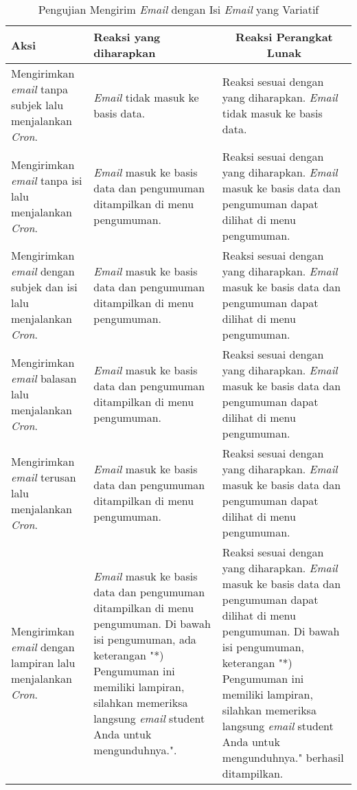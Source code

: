 \begin{itemize}
	\newpage
      \begin{longtable}{|p{5cm}|p{5cm}|p{5cm}|}
        \caption{Pengujian Mengirim \textit{Email} dengan Isi \textit{Email} yang Variatif}
        \label{table:pengujian-fungsional-isi-variatif}\\
        \hline
        \centering Aksi	& 	\centering Reaksi yang diharapkan &  \multicolumn{1}{c|}{Reaksi Perangkat Lunak} \\
        \hline
        Mengirimkan \textit{email} tanpa subjek lalu menjalankan \textit{Cron}. & \textit{Email} tidak masuk ke basis data. & Reaksi sesuai dengan yang diharapkan. \textit{Email} tidak masuk ke basis data. \\
        \hline
        Mengirimkan \textit{email} tanpa isi lalu menjalankan \textit{Cron}. & \textit{Email} masuk ke basis data dan pengumuman ditampilkan di menu pengumuman. & Reaksi sesuai dengan yang diharapkan. \textit{Email} masuk ke basis data dan pengumuman dapat dilihat di menu pengumuman. \\
        \hline
        Mengirimkan \textit{email} dengan subjek dan isi lalu menjalankan \textit{Cron}. & \textit{Email} masuk ke basis data dan pengumuman ditampilkan di menu pengumuman. & Reaksi sesuai dengan yang diharapkan. \textit{Email} masuk ke basis data dan pengumuman dapat dilihat di menu pengumuman. \\
        \hline
        Mengirimkan \textit{email} balasan lalu menjalankan \textit{Cron}. & \textit{Email} masuk ke basis data dan pengumuman ditampilkan di menu pengumuman. & Reaksi sesuai dengan yang diharapkan. \textit{Email} masuk ke basis data dan pengumuman dapat dilihat di menu pengumuman. \\
        \hline
        Mengirimkan \textit{email} terusan lalu menjalankan \textit{Cron}. & \textit{Email} masuk ke basis data dan pengumuman ditampilkan di menu pengumuman. & Reaksi sesuai dengan yang diharapkan. \textit{Email} masuk ke basis data dan pengumuman dapat dilihat di menu pengumuman. \\
        \hline
        Mengirimkan \textit{email} dengan lampiran lalu menjalankan \textit{Cron}. & \textit{Email} masuk ke basis data dan pengumuman ditampilkan di menu pengumuman. Di bawah isi pengumuman, ada keterangan "*) Pengumuman ini memiliki lampiran, silahkan memeriksa langsung \textit{email} student Anda untuk mengunduhnya.". & Reaksi sesuai dengan yang diharapkan. \textit{Email} masuk ke basis data dan pengumuman dapat dilihat di menu pengumuman. Di bawah isi pengumuman, keterangan "*) Pengumuman ini memiliki lampiran, silahkan memeriksa langsung \textit{email} student Anda untuk mengunduhnya." berhasil ditampilkan. \\

\end{longtable}
\end{itemize}
